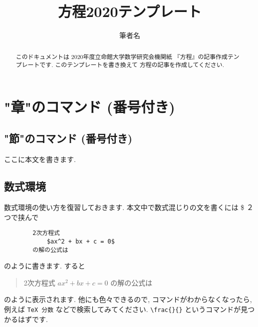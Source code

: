 
\title{方程2020テンプレート}
\author{筆者名}
\date{}

\maketitle

\begin{abstract}
    このドキュメントは
    2020年度立命館大学数学研究会機関紙
    『方程』の記事作成テンプレートです. 
    このテンプレートを書き換えて
    方程の記事を作成してください. 
\end{abstract}


\section{"章"のコマンド (番号付き) }

\subsection{"節"のコマンド (番号付き) }

ここに本文を書きます. 


\subsection{数式環境}

数式環境の使い方を復習しておきます. 
本文中で数式混じりの文を書くには \$ ２つで挟んで
\begin{screen}
    \begin{verbatim}
        2次方程式
            $ax^2 + bx + c = 0$
        の解の公式は\end{verbatim}
\end{screen}
のように書きます. すると
\begin{screen}
    \begin{quote}
        2次方程式
            $ ax^2 + bx + c = 0 $
        の解の公式は
    \end{quote}
\end{screen}
のように表示されます. 他にも色々できるので, 
コマンドがわからなくなったら, 例えば
\verb|TeX 分数|
などで検索してみてください. 
\verb|\frac{}{}|
というコマンドが見つかるはずです. 

